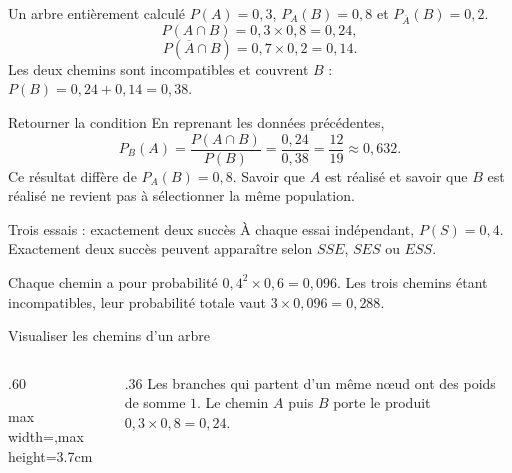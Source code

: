 \documentclass[aspectratio=169,12pt]{beamer}
\begin{document}
\renewcommand{\slidekind}{MÉTHODE \& EXEMPLE}
\begin{frame}[t,fragile]{Un arbre entièrement calculé}
$P(A)=0,3$, $P_A(B)=0,8$ et $P_{\overline A}(B)=0,2$.\[P(A\cap B)=0,3\times0,8=0,24,\]\[P(\overline A\cap B)=0,7\times0,2=0,14.\] Les deux chemins sont incompatibles et couvrent $B$ : $P(B)=0,24+0,14=0,38$.
\end{frame}
\renewcommand{\slidekind}{COMPRENDRE}
\begin{frame}[t,fragile]{Retourner la condition}
En reprenant les données précédentes,\[P_B(A)=\frac{P(A\cap B)}{P(B)}=\frac{0,24}{0,38}=\frac{12}{19}\approx0,632.\] Ce résultat diffère de $P_A(B)=0,8$. Savoir que $A$ est réalisé et savoir que $B$ est réalisé ne revient pas à sélectionner la même population.
\end{frame}
\renewcommand{\slidekind}{COMPRENDRE}
\begin{frame}[t,fragile]{Trois essais : exactement deux succès}
À chaque essai indépendant, $P(S)=0,4$. Exactement deux succès peuvent apparaître selon $SSE$, $SES$ ou $ESS$.\medskip\par Chaque chemin a pour probabilité $0,4^2\times0,6=0,096$. Les trois chemins étant incompatibles, leur probabilité totale vaut $3\times0,096=0,288$.
\end{frame}
\renewcommand{\slidekind}{COMPRENDRE}
\begin{frame}[t,fragile]{Visualiser les chemins d’un arbre}
\begin{columns}[c,onlytextwidth]\begin{column}{.60\textwidth}\centering\begin{adjustbox}{max width=\linewidth,max height=3.7cm}\end{adjustbox}\end{column}\begin{column}{.36\textwidth} Les branches qui partent d’un même nœud ont des poids de somme $1$. Le chemin $A$ puis $B$ porte le produit $0,3\times0,8=0,24$.\end{column}\end{columns}
\end{frame}
\end{document}
